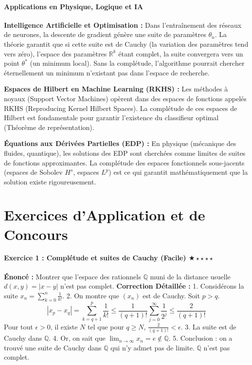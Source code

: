 \documentclass[11pt,a4paper]{article}
\begin{document}
\subsection*{Applications en Physique, Logique et IA}

\textbf{Intelligence Artificielle et Optimisation :}
Dans l'entraînement des réseaux de neurones, la descente de gradient génère une suite de paramètres $\theta_n$. La théorie garantit que si cette suite est de Cauchy (la variation des paramètres tend vers zéro), l'espace des paramètres $\mathbb{R}^k$ étant complet, la suite convergera vers un point $\theta^*$ (un minimum local). Sans la complétude, l'algorithme pourrait chercher éternellement un minimum n'existant pas dans l'espace de recherche.

\textbf{Espaces de Hilbert en Machine Learning (RKHS) :}
Les méthodes à noyaux (Support Vector Machines) opèrent dans des espaces de fonctions appelés RKHS (Reproducing Kernel Hilbert Spaces). La complétude de ces espaces de Hilbert est fondamentale pour garantir l'existence du classifieur optimal (Théorème de représentation).

\textbf{Équations aux Dérivées Partielles (EDP) :}
En physique (mécanique des fluides, quantique), les solutions des EDP sont cherchées comme limites de suites de fonctions approximantes. La complétude des espaces fonctionnels sous-jacents (espaces de Sobolev $H^s$, espaces $L^p$) est ce qui garantit mathématiquement que la solution existe rigoureusement.


\newpage
\part{Exercices d'Application et de Concours}
\subsection*{Exercice 1 : Complétude et suites de Cauchy (Facile) \quad $\bigstar\star\star\star\star$}

\textbf{Énoncé :}
Montrer que l'espace des rationnels $\mathbb{Q}$ muni de la distance usuelle $d(x, y) = |x - y|$ n'est pas complet.
\textbf{Correction Détaillée :}
1. Considérons la suite $x_n = \sum_{k=0}^n \frac{1}{k!}$.
2. On montre que $(x_n)$ est de Cauchy. Soit $p > q$.
$$|x_p - x_q| = \sum_{k=q+1}^p \frac{1}{k!} \leq \frac{1}{(q+1)!} \sum_{j=0}^{\infty} \frac{1}{2^j} \leq \frac{2}{(q+1)!}$$
Pour tout $\epsilon > 0$, il existe $N$ tel que pour $q \geq N$, $\frac{2}{(q+1)!} < \epsilon$.
3. La suite est de Cauchy dans $\mathbb{Q}$.
4. Or, on sait que $\lim_{n \to \infty} x_n = e \notin \mathbb{Q}$.
5. Conclusion : on a trouvé une suite de Cauchy dans $\mathbb{Q}$ qui n'y admet pas de limite. $\mathbb{Q}$ n'est pas complet.
\end{document}
